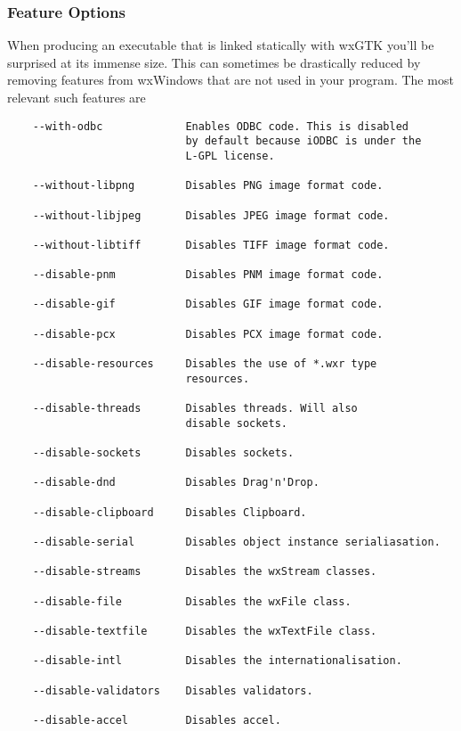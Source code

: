 \subsubsection{Feature Options}

When producing an executable that is linked statically with wxGTK
you'll be surprised at its immense size. This can sometimes be
drastically reduced by removing features from wxWindows that 
are not used in your program. The most relevant such features
are

\begin{verbatim}
	--with-odbc             Enables ODBC code. This is disabled
                            by default because iODBC is under the
                            L-GPL license.
	
	--without-libpng	    Disables PNG image format code.
	
	--without-libjpeg	    Disables JPEG image format code.
	
	--without-libtiff	    Disables TIFF image format code.
    
	--disable-pnm		    Disables PNM image format code.
	
	--disable-gif		    Disables GIF image format code.
	
	--disable-pcx		    Disables PCX image format code.
	
    --disable-resources     Disables the use of *.wxr type
	                        resources.
		
	--disable-threads       Disables threads. Will also
	                        disable sockets.

	--disable-sockets       Disables sockets.

	--disable-dnd           Disables Drag'n'Drop.
	
	--disable-clipboard     Disables Clipboard.
	
	--disable-serial        Disables object instance serialiasation.
	
	--disable-streams       Disables the wxStream classes.
	
	--disable-file          Disables the wxFile class.
	
	--disable-textfile      Disables the wxTextFile class.
	
	--disable-intl          Disables the internationalisation.
	
	--disable-validators    Disables validators.
	
	--disable-accel         Disables accel.
\end{verbatim}
	
